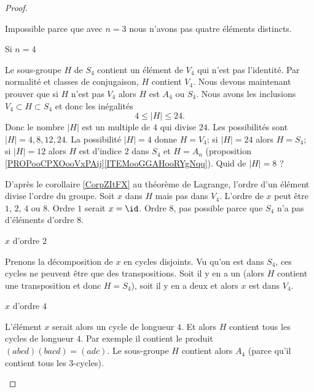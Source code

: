\begin{proof}
\begin{subproof}
\begin{subproof}
                    Impossible parce que avec \( n=3\) nous n'avons pas quatre éléments distincts. 

                \item[Si \( n=4\)]

                    Le sous-groupe \( H\) de \( S_4\) contient un élément de \( V_4\) qui n'est pas l'identité. Par normalité et classes de conjugaison, \( H\) contient \( V_4\). Nous devons maintenant prouver que si \( H\) n'est pas \( V_4\) alors \( H\) est \( A_4\) ou \( S_4\). Nous avons les inclusions \( V_4\subset H\subset S_4\) et donc les inégalités
                    \begin{equation}
                        4\leq | H |\leq 24.
                    \end{equation}
                    Donc le nombre \( | H |\) est un multiple de \( 4\) qui divise \( 24\). Les possibilités sont \( | H |=4,8,12,24\). La possibilité \( | H |=4\) donne \( H=V_4\); si \( |H |=24\) alors \( H=S_4\); si \( | H |=12\) alors \( H\) est d'indice \( 2\) dans \( S_4\) et \( H=A_n\) (proposition \ref{PROPooCPXOooVxPAij}\ref{ITEMooGGAHooRYgNqq}). Quid de \( | H |=8\) ?

                    D'après le corollaire \ref{CorpZItFX} au théorème de Lagrange, l'ordre d'un élément divise l'ordre du groupe. Soit \( x\) dans \( H\) mais pas dans \( V_4\). L'ordre de \( x\) peut être \( 1\), \( 2\), \( 4\) ou \( 8\). Ordre \( 1\) serait \( x=\id\). Ordre \( 8\), pas possible parce que \( S_4\) n'a pas d'éléments d'ordre \( 8\).
                    \begin{subproof}
                        \item[\( x\) d'ordre \( 2\)]

                            Prenons la décomposition de \( x\) en cycles disjoints. Vu qu'on est dans \( S_4\), ces cycles ne peuvent être que des transpositions. Soit il y en a un (alors \( H\) contient une transposition et donc \( H=S_4\)), soit il y en a deux et alors \( x\) est dans \( V_4\).

                        \item[\( x\) d'ordre \( 4\)]
                        
                            L'élément \( x\) serait alors un cycle de longueur \( 4\). Et alors \( H\) contient tous les cycles de longueur \( 4\). Par exemple il contient le produit \( (abcd)(bacd)=(adc)\). Le sous-groupe \( H\) contient alors \( A_4\) (parce qu'il contient tous les \( 3\)-cycles).
                    \end{subproof}


\end{subproof}
\end{subproof}
\end{proof}
